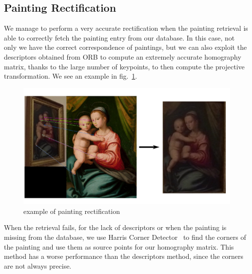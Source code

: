 \subsection{Painting Rectification}
We manage to perform a very accurate rectification when the painting retrieval is able to correctly fetch the painting entry from our database. In this case, not only we have the correct correspondence of paintings, but we can also exploit the descriptors obtained from ORB to compute an extremely accurate homography matrix, thanks to the large number of keypoints, to then compute the projective transformation. We see an example in fig.~\ref{fig:rectification_ex}.

\begin{figure}[h!]
    \centering
    \includegraphics[width=.49\textwidth]{pictures/painting_rectification/rectification.png}
    \caption{example of painting rectification}
    \label{fig:rectification_ex}
\end{figure}

When the retrieval fails, for the lack of descriptors or when the painting is missing from the database, we use Harris Corner Detector~\cite{harris-corner} to find the corners of the painting and use them as source points for our homography matrix. This method has a worse performance than the descriptors method, since the corners are not always precise.
